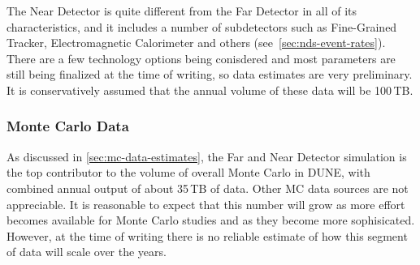 The Near Detector is quite different from the Far Detector in all of its characteristics, and it includes a number of subdetectors
such as Fine-Grained Tracker, Electromagnetic Calorimeter and others (see~\ref{sec:nds-event-rates}). There are a few technology
options being conisdered and most parameters are still being finalized at the time of writing, so data estimates are very preliminary.
It is conservatively assumed that the annual volume of these data will be 100\,TB.


\subsubsection{Monte Carlo Data}
As discussed in \ref{sec:mc-data-estimates}, the Far and Near Detector simulation is the top contributor to the volume of overall
Monte Carlo in DUNE, with combined annual output of about 35\,TB of data. Other MC data sources are not appreciable.
It is reasonable to expect that this number will grow as more effort becomes available for Monte Carlo studies and
as they become more sophisicated. However, at the time of writing there is no reliable estimate of how this segment of data
will scale over the years.


